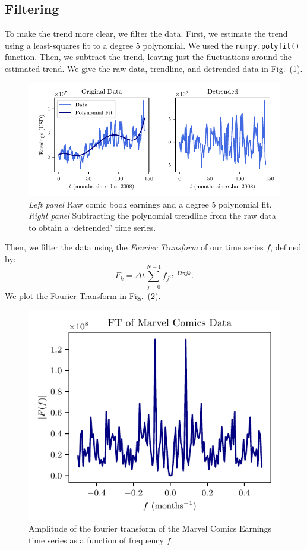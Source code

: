 \documentclass[12pt]{article}
\newcommand{\I}{\mathrm i}
\newcommand{\e}{\mathrm e}
\begin{document}
\subsection{Filtering}
\label{sec:filtering}
To make the trend more clear, we filter the data.  First, we estimate the trend using a least-squares fit to a degree 5 polynomial.  We used the \texttt{numpy.polyfit()} function.  Then, we subtract the trend, leaving just the fluctuations around the estimated trend.  We give the raw data, trendline, and detrended data in Fig.~(\ref{fig:detrended1}).
\begin{figure}[ht]
    \centering
    \includegraphics{figures/detrended1.pdf}
    \caption{\textit{Left panel} Raw comic book earnings and a degree 5 polynomial fit.  \textit{Right panel} Subtracting the polynomial trendline from the raw data to obtain a `detrended' time series.}\label{fig:detrended1}
\end{figure}
Then, we filter the data using the \textit{Fourier Transform} of our time series $f$, defined by:
\begin{equation}
    F_k = \Delta t \sum_{j=0}^{N-1}f_j \e^{-\I 2 \pi j k}.
\end{equation}
We plot the Fourier Transform in Fig.~(\ref{fig:fourier}).
\begin{figure}[ht]
    \centering
    \includegraphics{figures/fourier.pdf}
    \caption{Amplitude of the fourier transform of the Marvel Comics Earnings time series as a function of frequency $f$.}\label{fig:fourier}
\end{figure}
\end{document}
